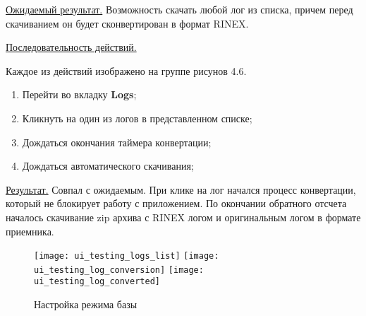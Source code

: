 \underline{Ожидаемый результат.} Возможность скачать любой лог из списка, причем перед скачиванием он будет сконвертирован в формат RINEX.

\underline{Последовательность действий.}

Каждое из действий изображено на группе рисунов 4.6.

\begin{enumerate}
  \item Перейти во вкладку \textbf{Logs};
  \item Кликнуть на один из логов в представленном списке;
  \item Дождаться окончания таймера конвертации;
  \item Дождаться автоматического скачивания;
\end{enumerate}

\underline{Результат.} Совпал с ожидаемым. При клике на лог начался процесс конвертации, который не блокирует работу с приложением. По окончании обратного отсчета началось скачивание zip архива с RINEX логом и оригинальным логом в формате приемника.

\begin{figure}
  \label{img:latex}
  \center
  \texttt{[image: ui\_testing\_logs\_list]}
  \texttt{[image: ui\_testing\_log\_conversion]}
  \texttt{[image: ui\_testing\_log\_converted]}
  \caption{Настройка режима базы}
\end{figure}


















